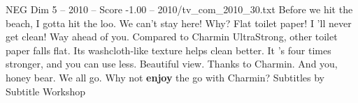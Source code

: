 \begin{textsample}{NEG Dim 5 – 2010 – Score -1.00 – 2010/tv\_com\_2010\_30.txt}  \label{ex:f5_neg_029}
Before we hit the beach, I gotta hit the loo.
We can't stay here!
Why?
Flat toilet paper!
I 'll never get clean!
Way ahead of you.
Compared to Charmin UltraStrong, other toilet paper falls flat.
Its washcloth-like texture helps clean better.
It 's four times stronger, and you can use less.
Beautiful view.
Thanks to Charmin.
And you, honey bear.
We all go.
Why not \textbf{enjoy} the go with Charmin?
Subtitles by Subtitle Workshop

\end{textsample}
